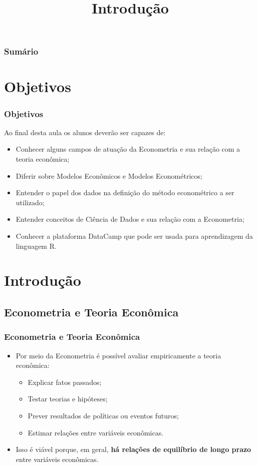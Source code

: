 \documentclass[10pt,xcolor=table]{beamer}
\title[UFRGS]{Introdução}
\author[Introdução à Econometria]{}
\date{}
\begin{document}



\begin{frame}
   \titlepage
\end{frame}

\begin{frame}[plain]\frametitle{Sumário}
\tableofcontents
\end{frame}


\section{Objetivos}

\begin{frame}\frametitle{Objetivos}
Ao final desta aula os alunos deverão ser capazes de:
  \begin{itemize}
    \item Conhecer alguns campos de atuação da Econometria e sua relação com a teoria econômica;
    \item Diferir sobre Modelos Econômicos e Modelos Econométricos;
    \item Entender o papel dos dados na definição do método econométrico a ser utilizado;
    \item Entender conceitos de Ciência de Dados e sua relação com a Econometria;
    \item Conhecer a plataforma DataCamp que pode ser usada para aprendizagem da linguagem R.
  \end{itemize}
\end{frame}


\section{Introdução}

\subsection{Econometria e Teoria Econômica}
\begin{frame}\frametitle{Econometria e Teoria Econômica}
  \begin{itemize}
    \item Por meio da Econometria é possível avaliar empiricamente a teoria econômica:
    \begin{itemize}
      \item Explicar fatos passados;
      \item Testar teorias e hipóteses;
      \item Prever resultados de políticas ou eventos futuros;
      \item Estimar relações entre variáveis econômicas.
    \end{itemize}
    \item Isso é viável porque, em geral, \textbf{há relações de equilíbrio de longo prazo} entre variáveis econômicas.
  \end{itemize}
\end{frame}
\end{document}
